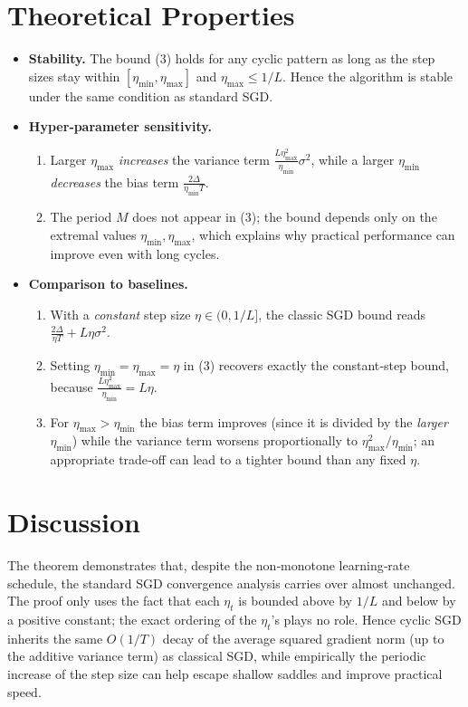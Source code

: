 \documentclass{article}
\begin{document}
\section*{Theoretical Properties}
\begin{itemize}[leftmargin=*]
\item \textbf{Stability.} The bound (3) holds for any cyclic pattern as long as the step sizes stay within $[\eta_{\min},\eta_{\max}]$ and $\eta_{\max}\le 1/L$. Hence the algorithm is stable under the same condition as standard SGD.
\item \textbf{Hyper‑parameter sensitivity.}
    \begin{enumerate}
        \item Larger $\eta_{\max}$ \emph{increases} the variance term $\frac{L\eta_{\max}^{2}}{\eta_{\min}}\sigma^{2}$, while a larger $\eta_{\min}$ \emph{decreases} the bias term $\frac{2\Delta}{\eta_{\min}T}$.
        \item The period $M$ does not appear in (3); the bound depends only on the extremal values $\eta_{\min},\eta_{\max}$, which explains why practical performance can improve even with long cycles.
    \end{enumerate}
\item \textbf{Comparison to baselines.}
    \begin{enumerate}
        \item With a \emph{constant} step size $\eta\in(0,1/L]$, the classic SGD bound reads
        $\frac{2\Delta}{\eta T}+L\eta\sigma^{2}$.
        \item Setting $\eta_{\min}=\eta_{\max}=\eta$ in (3) recovers exactly the constant‑step bound, because $\frac{L\eta_{\max}^{2}}{\eta_{\min}}=L\eta$.
        \item For $\eta_{\max}> \eta_{\min}$ the bias term improves (since it is divided by the \emph{larger} $\eta_{\min}$) while the variance term worsens proportionally to $\eta_{\max}^{2}/\eta_{\min}$; an appropriate trade‑off can lead to a tighter bound than any fixed $\eta$.
    \end{enumerate}
\end{itemize}

\section*{Discussion}
The theorem demonstrates that, despite the non‑monotone learning‑rate schedule, the standard SGD convergence analysis carries over almost unchanged. The proof only uses the fact that each $\eta_t$ is bounded above by $1/L$ and below by a positive constant; the exact ordering of the $\eta_t$’s plays no role. Hence cyclic SGD inherits the same $O(1/T)$ decay of the average squared gradient norm (up to the additive variance term) as classical SGD, while empirically the periodic increase of the step size can help escape shallow saddles and improve practical speed.
\end{document}
